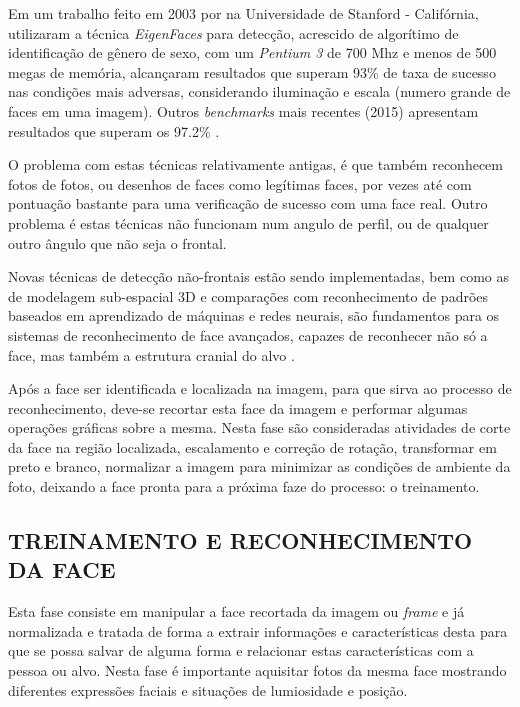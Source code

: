 Em um trabalho feito em 2003 por \cite{final_project_stanford} na Universidade de Stanford - Califórnia, utilizaram a técnica \textit{EigenFaces} para detecção, acrescido de algorítimo de identificação de gênero de sexo, com um \textit{Pentium 3} de 700 Mhz e menos de 500 megas de memória, alcançaram resultados que superam 93\% de taxa de sucesso nas condições mais adversas, considerando iluminação e escala (numero grande de faces em uma imagem). Outros \textit{benchmarks} mais recentes (2015) apresentam resultados que superam os 97.2\% \cite{stats_hong_kong}.

O problema com estas técnicas relativamente antigas, é que também reconhecem fotos de fotos, ou desenhos de faces como legítimas faces, por vezes até com pontuação bastante para uma verificação de sucesso com uma face real. Outro problema é estas técnicas não funcionam num angulo de perfil, ou de qualquer outro ângulo que não seja o frontal.

Novas técnicas de detecção não-frontais estão sendo implementadas, bem como as de modelagem sub-espacial 3D e comparações com reconhecimento de padrões baseados em aprendizado de máquinas e redes neurais, são fundamentos para os sistemas de reconhecimento de face avançados, capazes de reconhecer não só a face, mas também a estrutura cranial do alvo \cite{3dmodel_fd}. 

Após a face ser identificada e localizada na imagem, para que sirva ao processo de reconhecimento, deve-se recortar esta face da imagem e performar algumas operações gráficas sobre a mesma. Nesta fase são consideradas atividades de corte da face na região localizada, escalamento e correção de rotação, transformar em preto e branco, normalizar a imagem para minimizar as condições de ambiente da foto, deixando a face pronta para a próxima faze do processo: o treinamento.


\subsection{TREINAMENTO E RECONHECIMENTO DA FACE} 

Esta fase consiste em manipular a face recortada da imagem ou \textit{frame} e já normalizada e tratada de forma a extrair informações e características desta para que se possa salvar de alguma forma e relacionar estas características com a pessoa ou alvo. Nesta fase é importante aquisitar fotos da mesma face mostrando diferentes expressões faciais e situações de lumiosidade e posição.

